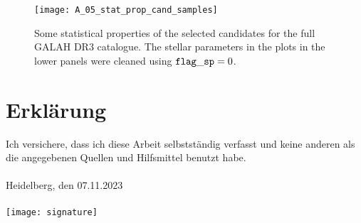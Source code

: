 \documentclass[a4paper,11pt]{article}
\begin{document}
%
\begin{figure}[ht]
 \centering
 \texttt{[image: A\_05\_stat\_prop\_cand\_samples]}
 \caption[Statistical properties of candidates for full GALAH DR3]{Some statistical properties of the selected candidates for the full GALAH DR3 catalogue. The stellar parameters in the plots in the lower panels were cleaned using ${\tt flag\_sp}=0$.}
 \label{fig:fullgalah_stat_prop_cand}
\end{figure}
%
%
%
%
%
\clearpage
{}
\section*{Erklärung}
Ich versichere, dass ich diese Arbeit selbstständig verfasst und keine anderen als die angegebenen Quellen und Hilfsmittel benutzt habe.
\\ \\
Heidelberg, den 07.11.2023\\ \\
\texttt{[image: signature]}
\end{document}
